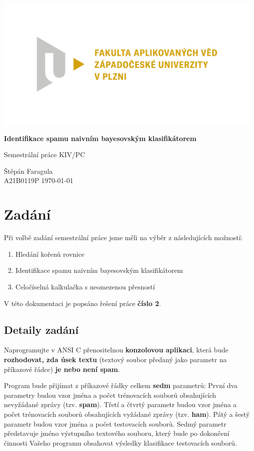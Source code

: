 \documentclass[12pt]{report}
\begin{document}
	
	\begin{titlepage}
		\centering
		\Large
		
		\includegraphics[width=.7\textwidth]{fav}
		
		\vspace{15mm}
		{\Huge\bfseries Identifikace spamu naivním bayesovským klasifikátorem}
		
		\vspace{15mm}
		{\LARGE Semestrální práce KIV/PC}
		
		\vfill
		\raggedright
		Štěpán Faragula\\
		A21B0119P
		\hfill 
		\today
	\end{titlepage}
	
	\tableofcontents

	\chapter{Zadání}
	Při volbě zadání semestrální práce jsme měli na výběr z následujících možností:
		
	\begin{enumerate}
		\item Hledání kořenů rovnice
		\item Identifikace spamu naivním bayesovským klasifikátorem
		\item Celočíselná kalkulačka s neomezenou přesností
	\end{enumerate}
		
	V této dokumentaci je popsáno řešení práce \textbf{číslo 2}.
	
	\section{Detaily zadání}
	Naprogramujte v ANSI C přenositelnou \textbf{konzolovou aplikaci}, která bude \textbf{rozhodovat, zda úsek textu} (textový soubor předaný jako parametr na příkazové řádce) \textbf{je nebo není spam}.
	
	Program bude přijímat z příkazové řádky celkem \textbf{sedm} parametrů: První dva parametry budou vzor jména a počet trénovacích souborů obsahujících nevyžádané zprávy (tzv. \textbf{spam}). Třetí a čtvrtý parametr budou vzor jména a počet trénovacích souborů obsahujících vyžádané zprávy (tzv. \textbf{ham}). Pátý a šestý parametr budou vzor jména a počet testovacích souborů. Sedmý parametr představuje jméno výstupního textového souboru, který bude po dokončení činnosti Vašeho	programu obsahovat výsledky klasifikace testovacích souborů.
	
\end{document}
